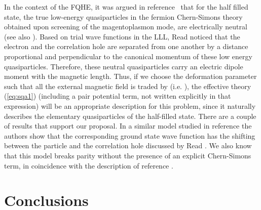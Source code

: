 \documentclass[a4paper,12pt]{article}
\begin{document}
In the context of the FQHE, it was argued in reference~\cite{read}
that for the half filled state, the true low-energy quasiparticles
in
the fermion Chern-Simons theory obtained upon screening of the
magentoplasmon mode, are electrically neutral (see also
\cite{read,ms,hp,dhl,hos}). Based on trial wave functions in the
LLL,
Read noticed that the electron and the correlation hole are
separated
from one another by a distance proportional and perpendicular to
the
canonical momentum \coordHE{} of these low energy quasiparticles.
Therefore, these neutral quasiparticles carry an electric dipole
moment \coordHE{} with \coordHE{} the magnetic
length.  Thus,
if we choose the deformation parameter \myHighlight{$\theta$}\coordHE{} such that all the
external
magnetic field is traded by \coordHE{} (i.e.  \coordHE{}), the
effective
theory (\ref{eq:sqa1}) (including a pair potential term, not
written
explicitly in that expression) will be an appropriate description
for
this problem, since it naturally describes the elementary
quasiparticles of the half-filled state.  There are a couple of
results that support our proposal. In a similar model studied in
reference \cite{wf} the authors show that the corresponding ground
state wave function has the shifting between the particle and the
correlation hole discussed by Read \cite{read}. We also know
\cite{IP}
that this model breaks parity without the presence of an explicit
Chern-Simons term, in coincidence with the description of reference
\cite{read}.

















\section{Conclusions}\label{sec:con}
\end{document}
